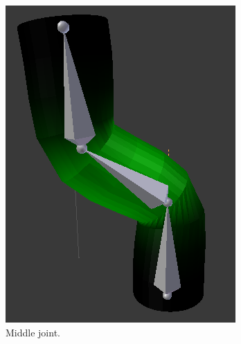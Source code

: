 \begin{figure}[H]
\begin{subfigure}{0.25\linewidth}
                \includegraphics[width=1\linewidth]{wonky_pole/middle_bone}
                \caption{Middle joint.}
            \end{subfigure}%
            \begin{subfigure}{0.25\linewidth}
            \centering

\end{subfigure}
\end{figure}
